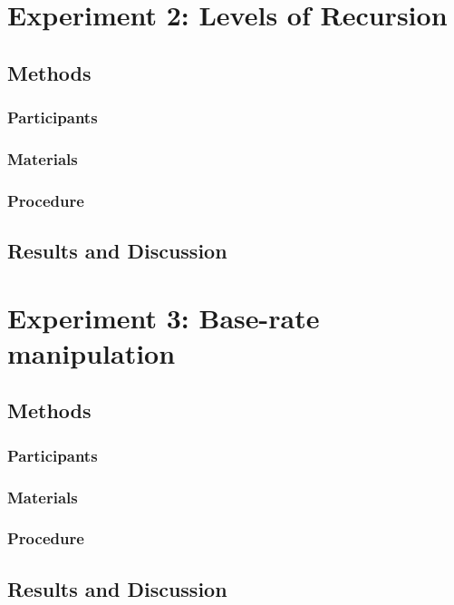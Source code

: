 \documentclass[man,noapacite]{apa2}
\begin{document}
\section{Experiment 2: Levels of Recursion}

\subsection{Methods}

\subsubsection{Participants}
\subsubsection{Materials}
\subsubsection{Procedure}

\subsection{Results and Discussion}

\section{Experiment 3: Base-rate manipulation}

\subsection{Methods}

\subsubsection{Participants}
\subsubsection{Materials}
\subsubsection{Procedure}

\subsection{Results and Discussion}
\end{document}
